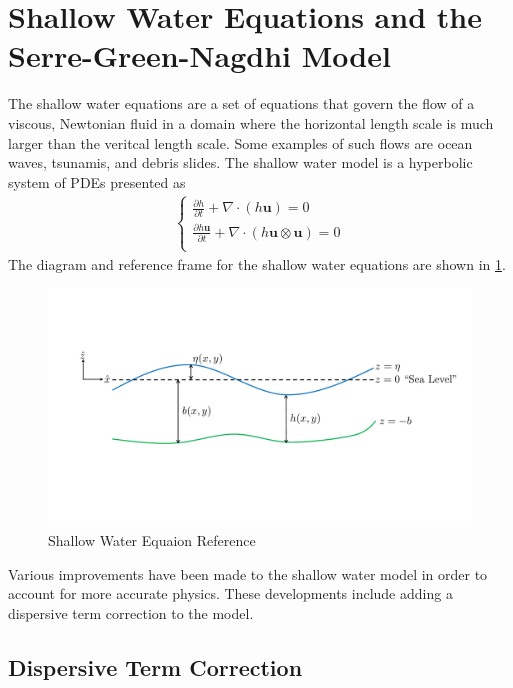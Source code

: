 \section{Shallow Water Equations and the Serre-Green-Nagdhi Model}

The shallow water equations are a set of equations that govern the flow of a viscous, Newtonian fluid in a domain where the horizontal length scale is much larger than the veritcal length scale. Some examples of such flows are ocean waves, tsunamis, and debris slides. The shallow water model is a hyperbolic system of PDEs presented as
\begin{align}
    \begin{cases}
        \frac{\partial h}{\partial t} + \nabla \cdot (h \textbf{u}) = 0 \\
        \frac{\partial h \textbf{u}}{\partial t} + \nabla \cdot (h \textbf{u} \otimes \textbf{u}) = 0 \\
    \end{cases}
\end{align}
The diagram and reference frame for the shallow water equations are shown in \ref{fig_swe}.

\begin{figure}
    \centering
    \includegraphics[width=\columnwidth]{figures/swe_model.pdf}
    \caption{Shallow Water Equaion Reference}
    \label{fig_swe}
\end{figure}

Various improvements have been made to the shallow water model in order to account for more accurate physics. These developments include adding a dispersive term correction to the model.

\subsection{Dispersive Term Correction}
\label{sec:dtc}

